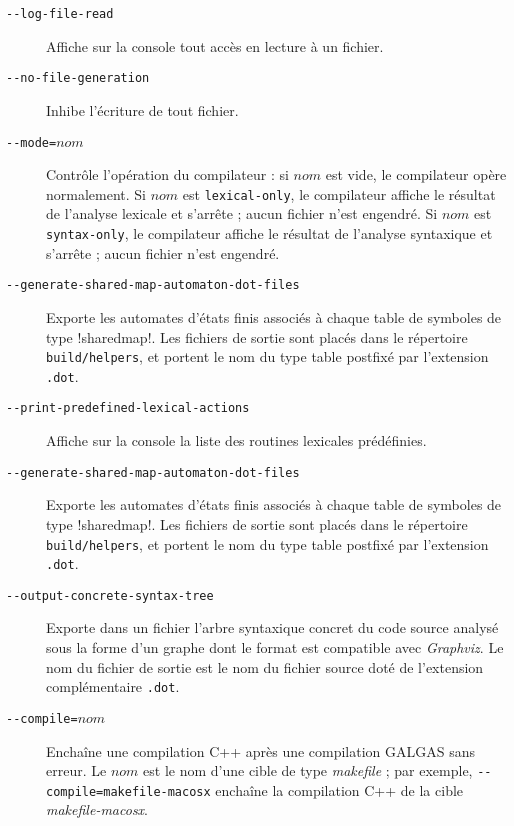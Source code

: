\begin{description}

  \item[\texttt{-{-}log-f{}ile-read}] Affiche sur la console tout accès en lecture à un fichier.


  \item[\texttt{-{-}no-f{}ile-generation}] Inhibe l'écriture de tout fichier.


  \item[\texttt{-{-}mode=$nom$}] Contrôle l'opération du compilateur : si $nom$ est vide, le compilateur opère normalement. Si $nom$ est \texttt{lexical-only}, le compilateur affiche le résultat de l'analyse lexicale et s'arrête ; aucun fichier n'est engendré. Si $nom$ est \texttt{syntax-only}, le compilateur affiche le résultat de l'analyse syntaxique et s'arrête ; aucun fichier n'est engendré.



  \item[\texttt{-{-}generate-shared-map-automaton-dot-f{}iles}] Exporte les automates d'états finis associés à chaque table de symboles de type \ggs!sharedmap!. Les fichiers de sortie sont placés dans le répertoire \texttt{build/helpers}, et portent le nom du type table postfixé par l'extension \texttt{.dot}.




  \item[\texttt{-{-}print-predefined-lexical-actions}] Affiche sur la console la liste des routines lexicales prédéfinies.


  \item[\texttt{-{-}generate-shared-map-automaton-dot-files}] Exporte les automates d'états finis associés à chaque table de symboles de type \ggs!sharedmap!. Les fichiers de sortie sont placés dans le répertoire \texttt{build/helpers}, et portent le nom du type table postfixé par l'extension \texttt{.dot}.





  \item[\texttt{-{-}output-concrete-syntax-tree}] Exporte dans un fichier l'arbre syntaxique concret du code source analysé sous la forme d'un graphe dont le format est compatible avec \emph{Graphviz}. Le nom du fichier de sortie est le nom du fichier source doté de l'extension complémentaire \texttt{.dot}.


  \item[\texttt{-{-}compile=$nom$}] Enchaîne une compilation C++ après une compilation GALGAS sans erreur. Le $nom$ est le nom d'une cible de type \emph{makefile} ; par exemple, \texttt{-{-}compile=makefile-macosx} enchaîne la compilation C++ de la cible \emph{makefile-macosx}.





\end{description}
